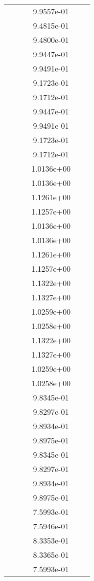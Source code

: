\begin{xltabular}{\textwidth}{r|rS[table-format=1.3e+2]S[table-format=1.4e+2]S[table-format=1.4e+2]S[table-format=-1.5]}
&  &  & 9.9557e-01 & & \\
&  &  & 9.4815e-01 & & \\
&  &  & 9.4800e-01 & & \\
&  &  & 9.9447e-01 & & \\
&  &  & 9.9491e-01 & & \\
&  &  & 9.1723e-01 & & \\
&  &  & 9.1712e-01 & & \\
&  &  & 9.9447e-01 & & \\
&  &  & 9.9491e-01 & & \\
&  &  & 9.1723e-01 & & \\
&  &  & 9.1712e-01 & & \\
&  &  & 1.0136e+00 & & \\
&  &  & 1.0136e+00 & & \\
&  &  & 1.1261e+00 & & \\
&  &  & 1.1257e+00 & & \\
&  &  & 1.0136e+00 & & \\
&  &  & 1.0136e+00 & & \\
&  &  & 1.1261e+00 & & \\
&  &  & 1.1257e+00 & & \\
&  &  & 1.1322e+00 & & \\
&  &  & 1.1327e+00 & & \\
&  &  & 1.0259e+00 & & \\
&  &  & 1.0258e+00 & & \\
&  &  & 1.1322e+00 & & \\
&  &  & 1.1327e+00 & & \\
&  &  & 1.0259e+00 & & \\
&  &  & 1.0258e+00 & & \\
&  &  & 9.8345e-01 & & \\
&  &  & 9.8297e-01 & & \\
&  &  & 9.8934e-01 & & \\
&  &  & 9.8975e-01 & & \\
&  &  & 9.8345e-01 & & \\
&  &  & 9.8297e-01 & & \\
&  &  & 9.8934e-01 & & \\
&  &  & 9.8975e-01 & & \\
&  &  & 7.5993e-01 & & \\
&  &  & 7.5946e-01 & & \\
&  &  & 8.3353e-01 & & \\
&  &  & 8.3365e-01 & & \\
&  &  & 7.5993e-01 & & \\

\end{xltabular}
